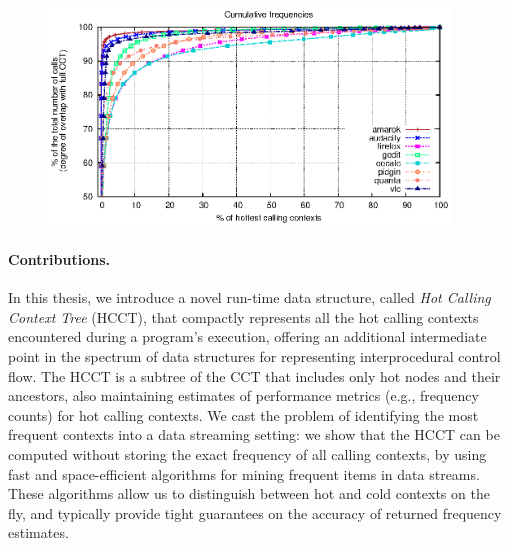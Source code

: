 \ifdefined\noauthorea
\begin{figure}[hb]
\begin{center}
\includegraphics[width=0.95\textwidth]{figures/hcct-skewness/hcct-skewness.eps}
\caption{\protect}
\end{center}
\end{figure}
\fi

\paragraph*{Contributions.} In this thesis, we introduce a novel run-time data structure, called {\em Hot Calling Context Tree} (HCCT), that compactly represents all the hot calling contexts encountered during a program's execution, offering an additional intermediate point in the spectrum of data structures for representing interprocedural control flow. The HCCT is a subtree of the CCT that includes only hot nodes and their ancestors, also maintaining estimates of performance metrics (e.g., frequency counts) for hot calling contexts. We cast the problem of identifying the most frequent contexts into a data streaming setting: we show that the HCCT can be computed without storing the exact frequency of all calling contexts, by using fast and space-efficient algorithms for mining frequent items in data streams. These algorithms allow us to distinguish between hot and cold contexts on the fly, and typically provide tight guarantees on the accuracy of returned frequency estimates.


